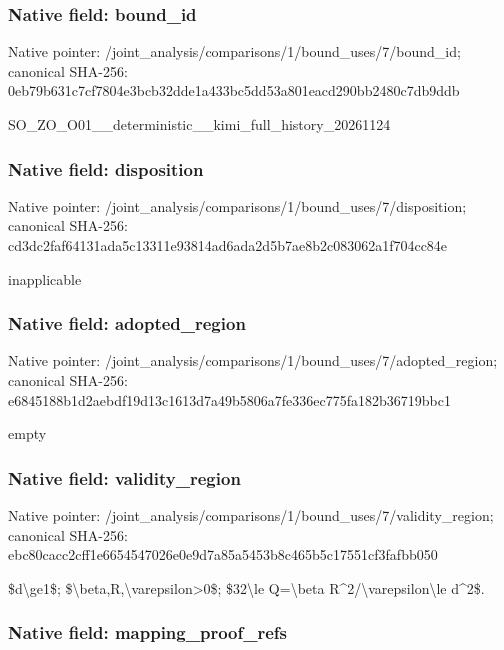 \documentclass[10pt,a4paper]{article}
\begin{document}
\subsubsection{Native field: bound\_id}


Native pointer: /joint\_analysis/comparis\allowbreak{}ons/1/bound\_uses/7/bound\allowbreak{}\_id; canonical SHA-256: 0eb79b631c7cf7804e3bcb32\allowbreak{}dde1a433bc5dd53a801eacd2\allowbreak{}90bb2480c7db9ddb


SO\_ZO\_O01\_\_deterministic\allowbreak{}\_\_kimi\_full\_history\_2026\allowbreak{}1124


\subsubsection{Native field: disposition}


Native pointer: /joint\_analysis/comparis\allowbreak{}ons/1/bound\_uses/7/dispo\allowbreak{}sition; canonical SHA-256: cd3dc2faf64131ada5c13311\allowbreak{}e93814ad6ada2d5b7ae8b2c0\allowbreak{}83062a1f704cc84e


inapplicable


\subsubsection{Native field: adopted\_region}


Native pointer: /joint\_analysis/comparis\allowbreak{}ons/1/bound\_uses/7/adopt\allowbreak{}ed\_region; canonical SHA-256: e6845188b1d2aebdf19d13c1\allowbreak{}613d7a49b5806a7fe336ec77\allowbreak{}5fa182b36719bbc1


empty


\subsubsection{Native field: validity\_region}


Native pointer: /joint\_analysis/comparis\allowbreak{}ons/1/bound\_uses/7/valid\allowbreak{}ity\_region; canonical SHA-256: ebc80cacc2cff1e665454702\allowbreak{}6e0e9d7a85a5453b8c465b5c\allowbreak{}17551cf3fafbb050


\$d\textbackslash{}ge1\$; \$\textbackslash{}beta,R,\textbackslash{}varepsilon>0\$; \$32\textbackslash{}le Q=\textbackslash{}beta R\textasciicircum{}2/\textbackslash{}varepsilon\textbackslash{}le d\textasciicircum{}2\$.


\subsubsection{Native field: mapping\_proof\_refs}
\end{document}
